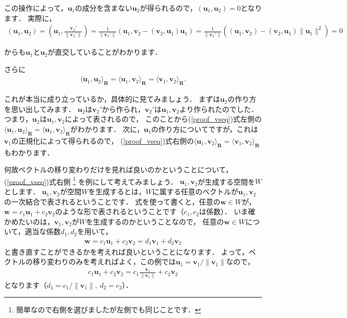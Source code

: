\documentclass[dvipdfmx]{jsarticle}
\theoremstyle{definition}
\begin{document}
この操作によって，$\bm{u}_1$の成分を含まない$\bm{u}_2$が得られるので，$(\bm{u}_1, \bm{u}_2) = 0$となります．
実際に，
\begin{align*}
    (\bm{u}_1, \bm{u}_2)
    = \left( \bm{u}_1, \frac{\bm{v}_2'}{\|\bm{v}_2'\|} \right)
    = \frac{1}{\|\bm{v}_2'\|} (\bm{u}_1, \bm{v}_2 - (\bm{v}_2, \bm{u}_1) \bm{u}_1)
    = \frac{1}{\|\bm{v}_2'\|} ((\bm{u}_1, \bm{v}_2) - (\bm{v}_2, \bm{u}_1)\|\bm{u}_1\|^2)
    = 0
\end{align*}

からも$\bm{u}_1$と$\bm{u}_2$が直交していることがわかります．

\begin{leftbar}
    さらに
    \begin{align}
        \langle \bm{u}_1, \bm{u}_2 \rangle_{\bm{R}}
        = \langle \bm{u}_1, \bm{v}_2 \rangle_{\bm{R}}
        = \langle \bm{v}_1, \bm{v}_2 \rangle_{\bm{R}} .
        \label{proof_vseq}
    \end{align}
\end{leftbar}

これが本当に成り立っているか，具体的に見てみましょう．
まずは$\bm{u}_2$の作り方を思い出してみます．
$\bm{u}_2$は$\bm{v}_2'$から作られ，$\bm{v}_2'$は$\bm{u}_1, \bm{v}_2$より作られたのでした．
つまり，$\bm{u}_2$は$\bm{u}_1, \bm{v}_2$によって表されるので，
このことから(\ref{proof_vseq})式左側の$\langle \bm{u}_1, \bm{u}_2 \rangle_{\bm{R}} = \langle \bm{u}_1, \bm{v}_2 \rangle_{\bm{R}}$がわかります．
次に，$\bm{u}_1$の作り方についてですが，これは$\bm{v}_1$の正規化によって得られるので，
(\ref{proof_vseq})式右側の$\langle \bm{u}_1, \bm{v}_2 \rangle_{\bm{R}} = \langle \bm{v}_1, \bm{v}_2 \rangle_{\bm{R}}$もわかります．

何故ベクトルの移り変わりだけを見れば良いのかということについて，(\ref{proof_vseq})式右側
\footnote{簡単なので右側を選びましたが左側でも同じことです．}
を例にして考えてみましょう．
$\bm{u}_1, \bm{v}_2$が生成する空間を$W$とします．
$\bm{u}_1, \bm{v}_2$が空間$W$を生成するとは，$W$に属する任意のベクトルが$\bm{u}_1, \bm{v}_2$の一次結合で表されるということです．
式を使って書くと，任意の$\bm{w} \in W$が，$\bm{w} = c_1 \bm{u}_1 + c_2 \bm{v}_2$のような形で表されるということです（$c_1, c_2$は係数）．
いま確かめたいのは，$\bm{v}_1, \bm{v}_2$が$W$を生成するのかということなので，
任意の$\bm{w} \in W$について，適当な係数$d_1, d_2$を用いて，
\begin{align*}
    \bm{w} = c_1 \bm{u}_1 + c_2 \bm{v}_2 = d_1 \bm{v}_1 + d_2 \bm{v}_2
\end{align*}
と書き直すことができるかを考えれば良いということになります．
よって，ベクトルの移り変わりのみを考えればよく，この例では$\bm{u}_1 = \bm{v}_1 / \| \bm{v}_1 \|$なので，
\begin{align*}
    c_1 \bm{u}_1 + c_2 \bm{v}_2 = c_1 \frac{\bm{v}_1}{\| \bm{v}_1 \|} + c_2 \bm{v}_2
\end{align*}
となります（$d_1 = c_1 / \| \bm{v}_1 \|, \ d_2 = c_2$）．
\end{document}
